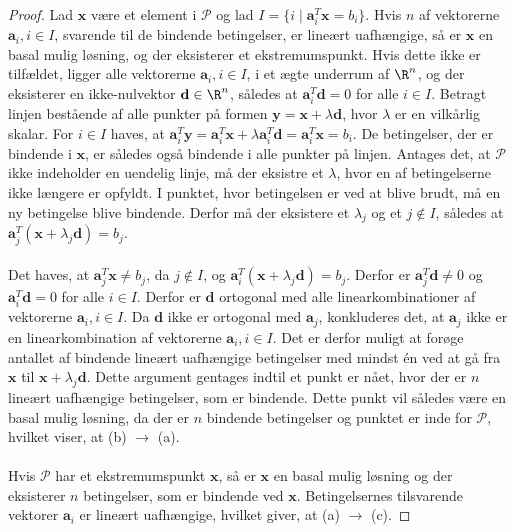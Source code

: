 \begin{proof}
Lad $\textbf{x}$ være et element i $\mathcal{P}$ og lad $I = \{ i \mid \textbf{a}_i^T\textbf{x} = b_i \}$.
Hvis $n$ af vektorerne  $\textbf{a}_i, i \in I$, svarende til de bindende betingelser, er lineært uafhængige, så er $\textbf{x}$ en basal mulig løsning, og der eksisterer et ekstremumspunkt.
Hvis dette ikke er tilfældet, ligger alle vektorerne $\textbf{a}_i, i \in I$, i et ægte underrum af $\R^n$, og der eksisterer en ikke-nulvektor $\textbf{d} \in \R^n$, således at $\textbf{a}_i^T\textbf{d} = 0$ for alle $i \in I$.
Betragt linjen bestående af alle punkter på formen $\textbf{y} = \textbf{x} + \lambda \textbf{d}$, hvor $\lambda$ er en vilkårlig skalar.
For $i \in I$ haves, at $\textbf{a}_i^T\textbf{y} = \textbf{a}_i^T\textbf{x} + \lambda \textbf{a}_i^T\textbf{d} = \textbf{a}_i^T\textbf{x} = b_i$.
De betingelser, der er bindende i $\textbf{x}$, er således også bindende i alle punkter på linjen.
Antages det, at $\mathcal{P}$ ikke indeholder en uendelig linje, må der eksistre et $\lambda$, hvor en af betingelserne ikke længere er opfyldt.
I punktet, hvor betingelsen er ved at blive brudt, må en ny betingelse blive bindende.
Derfor må der eksistere et $\lambda_j$ og et $j \notin I$, således at $\textbf{a}_j^T (\textbf{x} + \lambda_j\textbf{d}) = b_j$.\\\\
%
Det haves, at $\textbf{a}_j^T\textbf{x} \neq b_j$, da $j \notin I$, og $\textbf{a}_i^T (\textbf{x} + \lambda_j\textbf{d}) = b_j$.
Derfor er $\textbf{a}_j^T\textbf{d} \neq 0$ og $\textbf{a}_i^T\textbf{d} = 0$ for alle $i \in I$.
Derfor er $\textbf{d}$ ortogonal med alle linearkombinationer af vektorerne $\textbf{a}_i, i\in I$.
Da $\textbf{d}$ ikke er ortogonal med $\textbf{a}_j$, konkluderes det, at $\textbf{a}_j$ ikke er en linearkombination af vektorerne $\textbf{a}_i, i \in I$.
Det er derfor muligt at forøge antallet af bindende lineært uafhængige betingelser med mindst én ved at gå fra $\textbf{x}$ til $\textbf{x} + \lambda_j\textbf{d}$.
Dette argument gentages indtil et punkt er nået, hvor der er $n$ lineært uafhængige betingelser, som er bindende.
Dette punkt vil således være en basal mulig løsning, da der er $n$ bindende betingelser og punktet er inde for $\mathcal{P}$, hvilket viser, at (b) $\rightarrow$ (a).\\\\
%
Hvis $\mathcal{P}$ har et ekstremumspunkt $\textbf{x}$, så er $\textbf{x}$ en basal mulig løsning og der eksisterer $n$ betingelser, som er bindende ved $\textbf{x}$.
Betingelsernes tilsvarende vektorer $\textbf{a}_i$ er lineært uafhængige, hvilket giver, at (a) $\rightarrow$ (c).

\end{proof}
